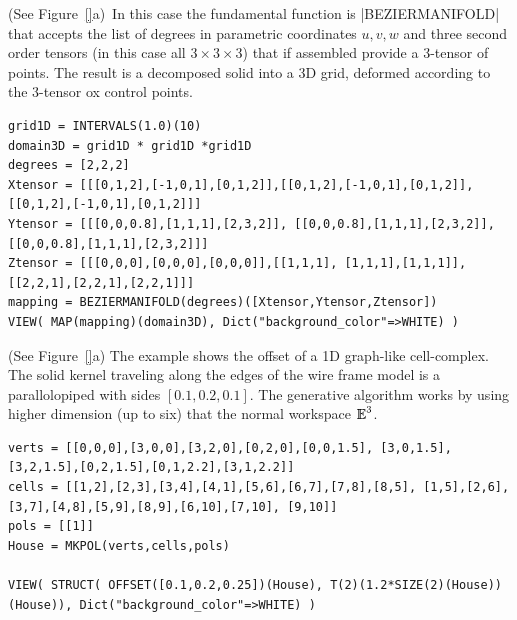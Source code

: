 \begin{coding}[Algebraic computation of FE = $\delta_1$]
\begin{condition} (See Figure~\ref{}a)\ In this case the fundamental function is |BEZIERMANIFOLD| that accepts the list of degrees in parametric coordinates $u,v,w$ and three second order tensors (in this case all $3\times 3\times 3$) that if assembled provide a 3-tensor of points. The result is a decomposed solid into a 3D grid, deformed according to the 3-tensor ox control points. 
\begin{lstlisting}[language=JuliaLocal, style=julia, mathescape=true]
grid1D = INTERVALS(1.0)(10)
domain3D = grid1D * grid1D *grid1D
degrees = [2,2,2]
Xtensor = [[[0,1,2],[-1,0,1],[0,1,2]],[[0,1,2],[-1,0,1],[0,1,2]], [[0,1,2],[-1,0,1],[0,1,2]]]
Ytensor = [[[0,0,0.8],[1,1,1],[2,3,2]], [[0,0,0.8],[1,1,1],[2,3,2]], [[0,0,0.8],[1,1,1],[2,3,2]]]
Ztensor = [[[0,0,0],[0,0,0],[0,0,0]],[[1,1,1], [1,1,1],[1,1,1]], [[2,2,1],[2,2,1],[2,2,1]]] 
mapping = BEZIERMANIFOLD(degrees)([Xtensor,Ytensor,Ztensor])
VIEW( MAP(mapping)(domain3D), Dict("background_color"=>WHITE) )
\end{lstlisting}
\end{condition}


\begin{condition} (See Figure~\ref{}a)
The example shows the offset of a 1D graph-like cell-complex. The solid kernel traveling along the edges of the wire frame model is a parallolopiped with sides $[0.1,0.2,0.1]$.
The generative algorithm works by using higher dimension (up to six) that the normal workspace $\mathbb{I\!\!E}^3$.

\begin{lstlisting}[language=JuliaLocal, style=julia, mathescape=true]
verts = [[0,0,0],[3,0,0],[3,2,0],[0,2,0],[0,0,1.5], [3,0,1.5],[3,2,1.5],[0,2,1.5],[0,1,2.2],[3,1,2.2]]
cells = [[1,2],[2,3],[3,4],[4,1],[5,6],[6,7],[7,8],[8,5], [1,5],[2,6],[3,7],[4,8],[5,9],[8,9],[6,10],[7,10], [9,10]]
pols = [[1]]
House = MKPOL(verts,cells,pols)

VIEW( STRUCT( OFFSET([0.1,0.2,0.25])(House), T(2)(1.2*SIZE(2)(House))(House)), Dict("background_color"=>WHITE) )
\end{lstlisting}
\end{condition}



\end{coding}
